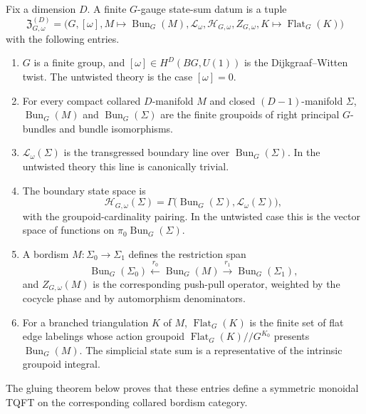 \begin{definition}
\label{def:finite-gauge-state-sum-datum}
Fix a dimension \(D\).  A finite \(G\)-gauge state-sum datum is a tuple
\[
  \mathfrak Z_{G,\omega}^{(D)}
  =
  \bigl(
    G,[\omega],
    M\mapsto\operatorname{Bun}_G(M),
    \mathcal L_\omega,
    \mathcal H_{G,\omega},
    Z_{G,\omega},
    K\mapsto\operatorname{Flat}_G(K)
  \bigr)
\]
with the following entries.
\begin{enumerate}[label=\textnormal{(\roman*)}]
\item \(G\) is a finite group, and
  \([\omega]\in H^D(BG,U(1))\) is the Dijkgraaf--Witten twist.  The
  untwisted theory is the case \([\omega]=0\).
\item For every compact collared \(D\)-manifold \(M\) and closed
  \((D-1)\)-manifold \(\Sigma\),
  \(\operatorname{Bun}_G(M)\) and \(\operatorname{Bun}_G(\Sigma)\) are the
  finite groupoids of right principal \(G\)-bundles and bundle isomorphisms.
\item \(\mathcal L_\omega(\Sigma)\) is the transgressed boundary line over
  \(\operatorname{Bun}_G(\Sigma)\).  In the untwisted theory this line is
  canonically trivial.
\item The boundary state space is
  \[
    \mathcal H_{G,\omega}(\Sigma)
    =
    \Gamma\bigl(\operatorname{Bun}_G(\Sigma),\mathcal L_\omega(\Sigma)\bigr),
  \]
  with the groupoid-cardinality pairing.  In the untwisted case this is the
  vector space of functions on \(\pi_0\operatorname{Bun}_G(\Sigma)\).
\item A bordism \(M:\Sigma_0\to\Sigma_1\) defines the restriction span
  \[
    \operatorname{Bun}_G(\Sigma_0)
    \xleftarrow{\ r_0\ }
    \operatorname{Bun}_G(M)
    \xrightarrow{\ r_1\ }
    \operatorname{Bun}_G(\Sigma_1),
  \]
  and \(Z_{G,\omega}(M)\) is the corresponding push-pull operator, weighted
  by the cocycle phase and by automorphism denominators.
\item For a branched triangulation \(K\) of \(M\),
  \(\operatorname{Flat}_G(K)\) is the finite set of flat edge labelings whose
  action groupoid \(\operatorname{Flat}_G(K)//G^{K_0}\) presents
  \(\operatorname{Bun}_G(M)\).  The simplicial state sum is a representative
  of the intrinsic groupoid integral.
\end{enumerate}
The gluing theorem below proves that these entries define a symmetric
monoidal TQFT on the corresponding collared bordism category.
\end{definition}

